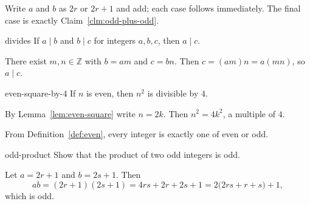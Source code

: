 \documentclass[11pt,a4paper]{article}
\begin{document}
\begin{proofbox}{}{}
Write $a$ and $b$ as $2r$ or $2r+1$ and add; each case follows immediately. The final case is exactly Claim~\ref{clm:odd-plus-odd}.
\end{proofbox}

\begin{proposition}{}{divides}
If $a\mid b$ and $b\mid c$ for integers $a,b,c$, then $a\mid c$.
\end{proposition}

\begin{proofbox}{}{}
There exist $m,n\in\mathbb{Z}$ with $b=am$ and $c=bn$. Then $c=(am)n=a(mn)$, so $a\mid c$.
\end{proofbox}

\begin{corollary}{}{even-square-by-4}
If $n$ is even, then $n^2$ is divisible by $4$.
\end{corollary}

\begin{proofbox}{}{}
By Lemma~\ref{lem:even-square} write $n=2k$. Then $n^2=4k^2$, a multiple of $4$.
\end{proofbox}

\begin{remark}
From Definition~\ref{def:even}, every integer is exactly one of even or odd.
\end{remark}

\begin{exercise}{}{odd-product}
Show that the product of two odd integers is odd.
\end{exercise}

\begin{solution}{}{}
Let $a=2r+1$ and $b=2s+1$. Then
\[
ab=(2r+1)(2s+1)=4rs+2r+2s+1=2\bigl(2rs+r+s\bigr)+1,
\]
which is odd.
\end{solution}
\end{document}
